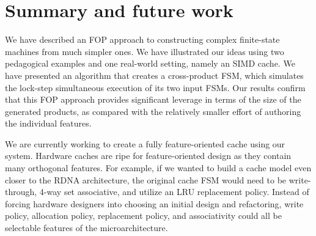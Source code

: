 \documentclass[conference]{IEEEtran}
\begin{document}
\section{Summary and future work}

We have described an FOP approach to constructing complex finite-state machines from much simpler ones.   We have illustrated our ideas using two pedagogical examples and one real-world setting, namely an SIMD cache.   We have presented an algorithm that creates a cross-product FSM, which simulates the lock-step simultaneous execution of its two input FSMs.  Our results confirm that this FOP approach provides significant leverage in terms of the size of the generated products, as compared with the relatively smaller effort of authoring the individual features.

We are currently working to create a fully feature-oriented cache using our system. Hardware caches are ripe for feature-oriented design as they contain many orthogonal features. For example, if we wanted to build a cache model even closer to the RDNA architecture, the original cache FSM would need to be write-through, 4-way set associative, and utilize an LRU replacement policy. Instead of forcing hardware designers into choosing an initial design and refactoring, write policy, allocation policy, replacement policy, and associativity could all be selectable features of the microarchitecture.




\end{document}
